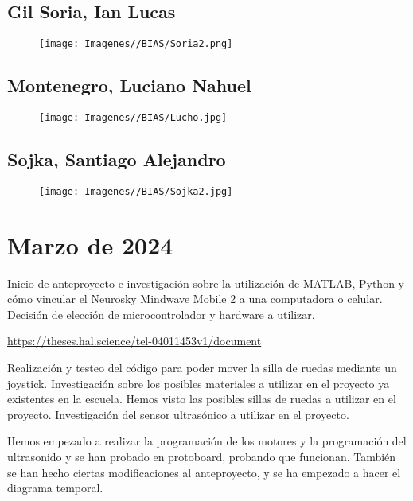\documentclass{article}
\begin{document}
\subsection{Gil Soria, Ian Lucas}

\begin{figure}[H]
    \texttt{[image: Imagenes//BIAS/Soria2.png]}
\end{figure}

\subsection{Montenegro, Luciano Nahuel}

\begin{figure}[H]
    \texttt{[image: Imagenes//BIAS/Lucho.jpg]}
\end{figure}

\subsection{Sojka, Santiago Alejandro}

\begin{figure}[H]
    \texttt{[image: Imagenes//BIAS/Sojka2.jpg]}
\end{figure}




\newpage

\section{Marzo de 2024}

Inicio de anteproyecto e investigación sobre la utilización de MATLAB, Python y cómo vincular el Neurosky Mindwave Mobile 2 a una computadora o celular. Decisión de elección de microcontrolador y hardware a utilizar.

\begin{center}
    \href{https://theses.hal.science/tel-04011453v1/document}{https://theses.hal.science/tel-04011453v1/document}
\end{center}

Realización y testeo del código para poder mover la silla de ruedas mediante un joystick.
Investigación sobre los posibles materiales a utilizar en el proyecto ya existentes en la escuela. Hemos visto las posibles sillas de ruedas a utilizar en el proyecto.
Investigación del sensor ultrasónico a utilizar en el proyecto.

Hemos empezado a realizar la programación de los motores y la programación del ultrasonido y se han probado en protoboard, probando que funcionan. También se han hecho ciertas modificaciones al anteproyecto, y se ha empezado a hacer el diagrama temporal. 
\end{document}
